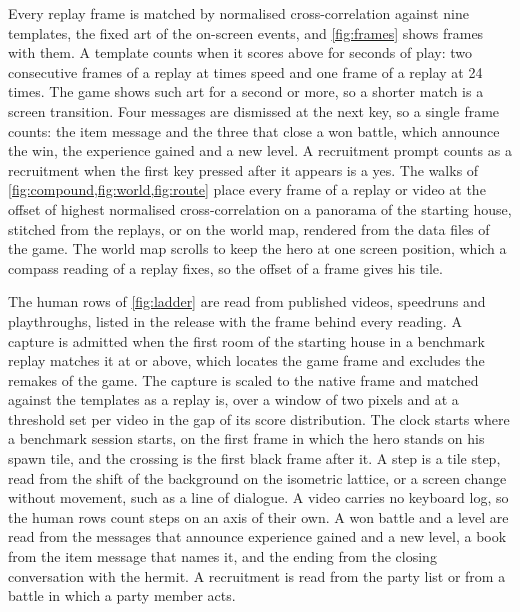 \documentclass{article} %
\begin{document}
Every replay frame is matched by normalised cross-correlation against nine templates, the fixed art of the on-screen events, and \cref{fig:frames} shows frames with them. A template counts when it scores above \ReplayThreshold{} for \ReplayHold{} seconds of play: two consecutive frames of a replay at \DefaultReplaySpeed{} times speed and one frame of a replay at 24 times. The game shows such art for a second or more, so a shorter match is a screen transition. Four messages are dismissed at the next key, so a single frame counts: the item message and the three that close a won battle, which announce the win, the experience gained and a new level. A recruitment prompt counts as a recruitment when the first key pressed after it appears is a yes. The walks of \cref{fig:compound,fig:world,fig:route} place every frame of a replay or video at the offset of highest normalised cross-correlation on a panorama of the starting house, stitched from the replays, or on the world map, rendered from the data files of the game. The world map scrolls to keep the hero at one screen position, which a compass reading of a replay fixes, so the offset of a frame gives his tile.

The human rows of \cref{fig:ladder} are read from \NhumanVideos{} published videos, \NhumanSpeedruns{} speedruns and \NhumanPlaythroughs{} playthroughs, listed in the release with the frame behind every reading. A capture is admitted when the first room of the starting house in a benchmark replay matches it at \HumanRoomGate{} or above, which locates the game frame and excludes the remakes of the game. The capture is scaled to the native frame and matched against the templates as a replay is, over a window of two pixels and at a threshold set per video in the gap of its score distribution. The clock starts where a benchmark session starts, on the first frame in which the hero stands on his spawn tile, and the crossing is the first black frame after it. A step is a tile step, read from the shift of the background on the isometric lattice, or a screen change without movement, such as a line of dialogue. A video carries no keyboard log, so the human rows count steps on an axis of their own. A won battle and a level are read from the messages that announce experience gained and a new level, a book from the item message that names it, and the ending from the closing conversation with the hermit. A recruitment is read from the party list or from a battle in which a party member acts.
\end{document}
